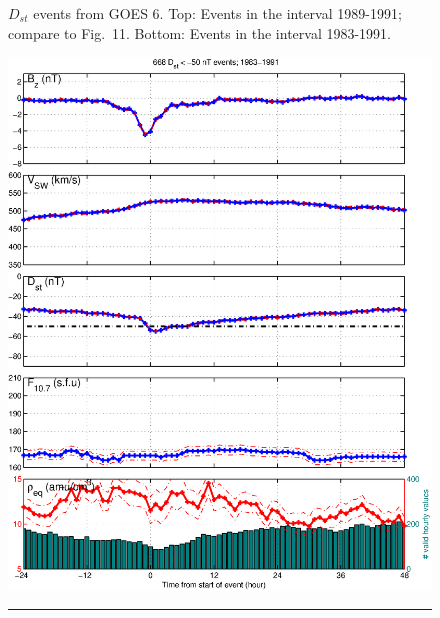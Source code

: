 \documentclass[10pt,twocolumn]{article}
\begin{document}
\begin{figure}[tp!]
\caption{$D_{st}$ events from GOES 6. Top: Events in the interval 1989-1991; compare to \cite{Takahashi2010} Fig.~11. Bottom: Events in the interval 1983-1991.}
\label{DailyAverages}
\end{figure}

\begin{figure}[tp!]
\centering
\includegraphics[scale=0.40]{paperfigures/stormavs-dst.eps}
\rule[1ex]{5cm}{1pt}

\end{figure}
\end{document}
